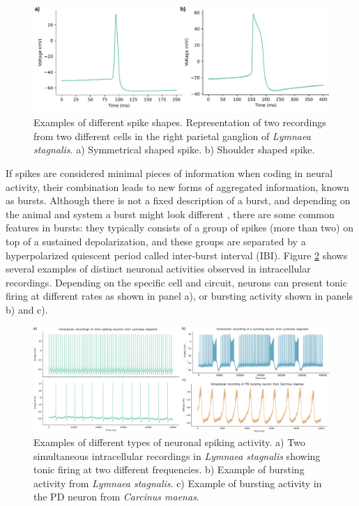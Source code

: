 \begin{figure}[htb!]
    \centering
    \includegraphics[width=\linewidth]{img/intro/spike-types.pdf}
    \caption{Examples of different spike shapes. Representation of two recordings from two different cells in the right parietal ganglion of \textit{Lymnaea stagnalis}. a) Symmetrical shaped spike. b) Shoulder shaped spike.}
    \label{fig:spike-types}
\end{figure}

If spikes are considered minimal pieces of information when coding in neural activity, their combination leads to new forms of aggregated information, known as bursts. Although there is not a fixed description of a burst, and depending on the animal and system a burst might look different \parencite{russell_bursting_1978,palmu_detection_2010,lundqvist_gamma_2016}, there are some common features in bursts: they typically consists of a group of spikes (more than two) on top of a sustained depolarization, and these groups are separated by a hyperpolarized quiescent period called inter-burst interval (IBI). Figure \ref{fig:spike_activity-types} shows several examples of distinct neuronal activities observed in intracellular recordings. Depending on the specific cell and circuit, neurons can present tonic firing at different rates as shown in panel a), or bursting activity shown in panels b) and c). 

\begin{figure}[htb!]
    \centering
    \includegraphics[width=\linewidth]{img/intro/spike_activity-types.png}
    \caption{Examples of different types of neuronal spiking activity. a) Two simultaneous intracellular recordings in \textit{Lymnaea stagnalis} showing tonic firing at two different frequencies. b) Example of bursting activity from \textit{Lymnaea stagnalis}. c) Example of bursting activity in the PD neuron from \textit{Carcinus maenas}.}
    \label{fig:spike_activity-types}
\end{figure}

